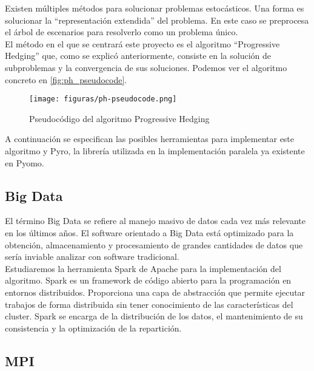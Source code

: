 
Existen múltiples métodos para solucionar problemas estocásticos. Una forma es solucionar la ``representación extendida'' del problema. En este caso se preprocesa el árbol de escenarios para resolverlo como un problema único.\\

El método en el que se centrará este proyecto es el algoritmo ``Progressive Hedging'' que, como se explicó anteriormente, consiste en la solución de subproblemas y la convergencia de sus soluciones. Podemos ver el algoritmo concreto en \autoref{fig:ph_pseudocode}.\\

\begin{figure}
    \centerline{\texttt{[image: figuras/ph-pseudocode.png]}}
    \caption{Pseudocódigo del algoritmo Progressive Hedging}
    \label{fig:ph_pseudocode}
\end{figure}

A continuación se especifican las posibles herramientas para implementar este algoritmo y Pyro, la librería utilizada en la implementación paralela ya existente en Pyomo.

\subsection{Big Data}

El término Big Data se refiere al manejo masivo de datos cada vez más relevante en los últimos años. El software orientado a Big Data está optimizado para la obtención, almacenamiento y procesamiento de grandes cantidades de datos que sería inviable analizar con software tradicional. \\

Estudiaremos la herramienta Spark de Apache para la implementación del algoritmo. Spark es un framework de código abierto para la programación en entornos distribuidos. Proporciona una capa de abstracción que permite ejecutar trabajos de forma distribuida sin tener conocimiento de las características del cluster. Spark se encarga de la distribución de los datos, el mantenimiento de su consistencia y la optimización de la repartición.\\

\subsection{MPI}


